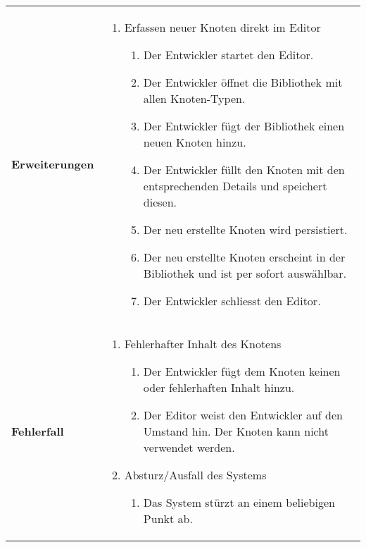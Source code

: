 \begin{longtabu}{p{0.5\textwidth}p{0.5\textwidth}}
    \cmidrule(r){1-1}\cmidrule(lr){2-2}
        \textbf{Erweiterungen} &
        \begin{enumerate}[label= (\alph*)]
            \item{Erfassen neuer Knoten direkt im Editor
                \begin{enumerate}[label= (\roman*)]
                    \item{Der Entwickler startet den Editor.}
                    \item{Der Entwickler öffnet die Bibliothek mit allen
                            Knoten-Typen.}
                    \item{Der Entwickler fügt der Bibliothek einen neuen
                            Knoten hinzu.}
                    \item{Der Entwickler füllt den Knoten mit den
                            entsprechenden Details und speichert diesen.}
                    \item{Der neu erstellte Knoten wird persistiert.}
                    \item{Der neu erstellte Knoten erscheint in der
                            Bibliothek und ist per sofort auswählbar.}
                    \item{Der Entwickler schliesst den Editor.}
                \end{enumerate}
            }
        \end{enumerate}\\
    \cmidrule(r){1-1}\cmidrule(lr){2-2}
        \textbf{Fehlerfall} &
        \begin{enumerate}[label= (\alph*)]
            \item{Fehlerhafter Inhalt des Knotens
                \begin{enumerate}[label= (\roman*)]
                    \item{Der Entwickler fügt dem Knoten keinen oder
                            fehlerhaften Inhalt hinzu.}
                    \item{Der Editor weist den Entwickler auf den Umstand
                            hin. Der Knoten kann nicht verwendet werden.}
                \end{enumerate}
            }
            \item{Absturz/Ausfall des Systems
                \begin{enumerate}[label= (\roman*)]
                        \item{Das System stürzt an einem beliebigen Punkt
                                ab.}

\end{enumerate}}
\end{enumerate}
\end{longtabu}
